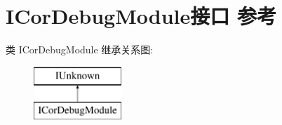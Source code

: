 \hypertarget{interface_i_cor_debug_module}{}\section{I\+Cor\+Debug\+Module接口 参考}
\label{interface_i_cor_debug_module}
类 I\+Cor\+Debug\+Module 继承关系图\+:\begin{figure}[H]
\begin{center}
\leavevmode
\includegraphics[height=2.000000cm]{interface_i_cor_debug_module}
\end{center}
\end{figure}
